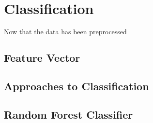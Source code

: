 \section{Classification}
Now that the data has been preprocessed 

\subsection{Feature Vector}


\subsection{Approaches to Classification}

\subsection{Random Forest Classifier}
